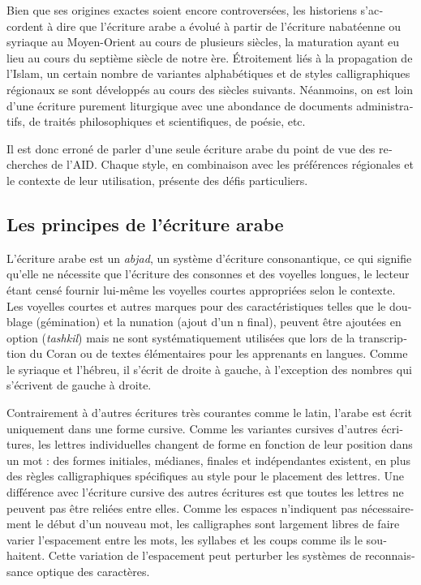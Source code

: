 \begin{french}
Bien que ses origines exactes soient encore controversées, les historiens
s'accordent à dire que l'écriture arabe a évolué à partir de l'écriture
nabatéenne ou syriaque au Moyen-Orient au cours de plusieurs siècles, la
maturation ayant eu lieu au cours du septième siècle de notre ère.  Étroitement
liés à la propagation de l'Islam, un certain nombre de variantes alphabétiques
et de styles calligraphiques régionaux se sont développés au cours des siècles
suivants. Néanmoins, on est loin d'une écriture purement liturgique avec une
abondance de documents administratifs, de traités philosophiques et
scientifiques, de poésie, etc.

Il est donc erroné de parler d'une seule écriture arabe du point de vue des
recherches de l'AID. Chaque style, en combinaison avec les préférences
régionales et le contexte de leur utilisation, présente des défis particuliers.

\subsection{Les principes de l'écriture arabe}

L'écriture arabe est un \emph{abjad}, un système d'écriture consonantique, ce qui
signifie qu'elle ne nécessite que l'écriture des consonnes et des voyelles
longues, le lecteur étant censé fournir lui-même les voyelles courtes
appropriées selon le contexte.  Les voyelles courtes et autres marques pour des
caractéristiques telles que le doublage (gémination) et la nunation (ajout d'un
n final), peuvent être ajoutées en option (\emph{tashkil}) mais ne sont
systématiquement utilisées que lors de la transcription du Coran ou de textes
élémentaires pour les apprenants en langues. Comme le syriaque et l'hébreu, il
s'écrit de droite à gauche, à l'exception des nombres qui s'écrivent de gauche
à droite.

Contrairement à d'autres écritures très courantes comme le latin, l'arabe est
écrit uniquement dans une forme cursive. Comme les variantes cursives d'autres
écritures, les lettres individuelles changent de forme en fonction de leur
position dans un mot : des formes initiales, médianes, finales et indépendantes
existent, en plus des règles calligraphiques spécifiques au style pour le
placement des lettres. Une différence avec l'écriture cursive des autres
écritures est que toutes les lettres ne peuvent pas être reliées entre elles.
Comme les espaces n'indiquent pas nécessairement le début d'un nouveau mot, les
calligraphes sont largement libres de faire varier l'espacement entre les mots,
les syllabes et les coups comme ils le souhaitent.  Cette variation de
l'espacement peut perturber les systèmes de reconnaissance optique des
caractères.


\end{french}
